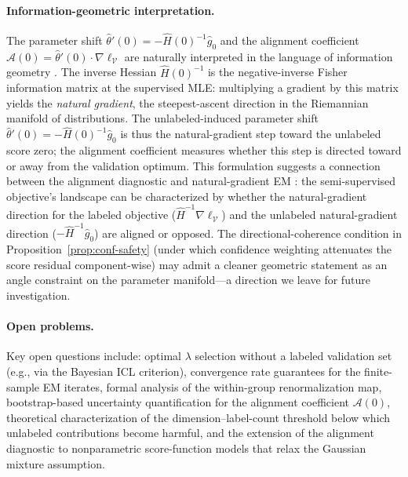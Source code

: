 \documentclass[11pt]{article}
\theoremstyle{definition}
\newcommand{\lam}{\lambda}
\newcommand{\calV}{\mathcal{V}}
\newcommand{\calA}{\mathcal{A}}
\begin{document}
\paragraph{Information-geometric interpretation.}
The parameter shift \(\hat\theta'(0) = -\hat H(0)^{-1}\hat g_0\) and the
alignment coefficient \(\calA(0) = \hat\theta'(0)\cdot\nabla\ell_\calV\)
are naturally interpreted in the language of information geometry
\citep{amari1998natural}.
The inverse Hessian \(\hat H(0)^{-1}\) is the negative-inverse Fisher
information matrix at the supervised MLE: multiplying a gradient by this
matrix yields the \emph{natural gradient}, the steepest-ascent direction
in the Riemannian manifold of distributions.
The unlabeled-induced parameter shift \(\hat\theta'(0) = -\hat H(0)^{-1}\hat g_0\)
is thus the natural-gradient step toward the unlabeled score zero;
the alignment coefficient measures whether this step is directed toward
or away from the validation optimum.
This formulation suggests a connection between the alignment diagnostic
and natural-gradient EM \citep{sato2001online}: the semi-supervised
objective's landscape can be characterized by whether the natural-gradient
direction for the labeled objective (\(\hat H^{-1}\nabla\ell_\calV\))
and the unlabeled natural-gradient direction (\(-\hat H^{-1}\hat g_0\))
are aligned or opposed.
The directional-coherence condition in Proposition~\ref{prop:conf-safety}
(under which confidence weighting attenuates the score residual component-wise)
may admit a cleaner geometric statement as an angle constraint
on the parameter manifold---a direction we leave for future investigation.

\paragraph{Open problems.}
Key open questions include: optimal $\lam$ selection without a labeled
validation set (e.g., via the Bayesian ICL criterion), convergence rate
guarantees for the finite-sample EM iterates, formal analysis of the
within-group renormalization map, bootstrap-based uncertainty
quantification for the alignment coefficient \(\calA(0)\),
theoretical characterization of the dimension--label-count threshold
below which unlabeled contributions become harmful,
and the extension of the alignment diagnostic to nonparametric score-function
models that relax the Gaussian mixture assumption.


\appendix
\end{document}
